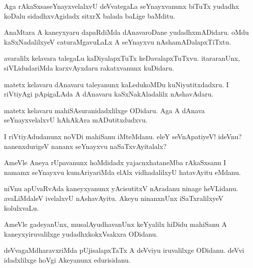 \begin{mng}
Aga rAkaSxsaseYnayxvelalxvU deVvategaLa seYnayxvanunx biTuTx yudadhx koDalu sidadhxvAgidadx sitxrX balada baLige baMditu.
\end{mng}

\begin{mng}
AnaMtara A kaneyxyaru dapaRdiMda dAnavaroDane yudadhxmADidaru. oMdu kaSxNadalilxyeV caturaMgavuLaLx A seYnayxvu nAshamADalapxTiTxtu.
\end{mng}

\begin{mng}
avaralilx kelavara talegaLu kaDiyalapxTuTx keDavalapxTuTxvu. itararanUnx, siVLidudariMda karxvAyxdaru rakatxvanunx kuDidaru.
\end{mng}

\begin{mng}
matetx kelavaru dAnavaru taleyanunx kaLedukoMDu kuNiyutitxdadxru. I riVtiyAgi pApigaLAda A dAnavaru kaSxNakAladalilx nAshavAdaru.
\end{mng}

\begin{mng}
matetx kelavaru mahiSAsuranidadxlilxge ODidaru. Aga A dAnava seYnayxvelalxvU hAhAkAra mADutitxdudxvu.
\end{mng}

\begin{mng}
I riVtiyAdudanunx noVDi mahiSanu iMteMdanu. eleY seVnApatiyeV! ideVnu? nanenxdurigeV nananx seYnayxvu naSaTxvAyitalalx?
\end{mng}

\begin{mng}
AmeVle Aneya rUpavanunx  hoMdidadx yajacnxhataneMba rAkaSxsanu I namamx seYnayxvu kumAriyariMda elAlx vidhadalilxyU hatavAyitu eMdanu.
\end{mng}

\begin{mng}
niVnu apUvaRvAda kaneyxyanunx yAcisutitxV nAradanu ninage heVLidanu. avaLiMdaleV ivelalxvU nAshavAyitu. Akeyu ninanxnUnx iSaTxralilxyeV kolulxvaLu.
\end{mng}

\begin{mng}
AmeVle gadeyanUnx, musalAyudhavanUnx keYyalilx hiDidu mahiSanu A kaneyxyiruvalilxge yudadhxkokxVsakxra ODidanu.
\end{mng}

\begin{mng}
deVvagaMdharavxriMda pUjisalapxTaTx A deVviyu iruvalilxge ODidanu. deVvi idadxlilxge hoVgi Akeyanunx edurisidanu.
\end{mng}

